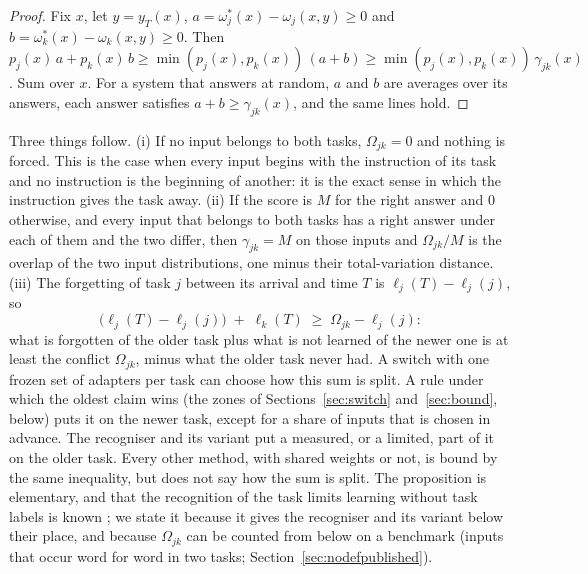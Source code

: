 \begin{proof}
Fix $x$, let $y = y_T(x)$, $a = \omega_j^*(x) - \omega_j(x, y) \ge 0$ and $b = \omega_k^*(x) - \omega_k(x, y) \ge 0$.
Then $p_j(x)\, a + p_k(x)\, b \ge \min(p_j(x), p_k(x))\,(a + b) \ge \min(p_j(x), p_k(x))\, \gamma_{jk}(x)$.
Sum over $x$. For a system that answers at random, $a$ and $b$ are averages over its answers, each
answer satisfies $a + b \ge \gamma_{jk}(x)$, and the same lines hold.
\end{proof}

Three things follow. (i) If no input belongs to both tasks, $\Omega_{jk} = 0$ and nothing is
forced. This is the case when every input begins with the instruction of its task and no
instruction is the beginning of another: it is the exact sense in which the instruction gives the
task away. (ii) If the score is $M$ for the right answer and $0$ otherwise, and every input that
belongs to both tasks has a right answer under each of them and the two differ, then
$\gamma_{jk} = M$ on those inputs and $\Omega_{jk}/M$ is the overlap of the two input
distributions, one minus their total-variation distance. (iii) The forgetting of task $j$ between
its arrival and time $T$ is $\ell_j(T) - \ell_j(j)$, so
\[
  \bigl(\ell_j(T) - \ell_j(j)\bigr) \;+\; \ell_k(T) \;\ge\; \Omega_{jk} - \ell_j(j) :
\]
what is forgotten of the older task plus what is not learned of the newer one is at least the
conflict $\Omega_{jk}$, minus what the older task never had. A switch with one frozen set of
adapters per task can choose how this sum is split. A rule under which the oldest claim wins
(the zones of Sections~\ref{sec:switch} and~\ref{sec:bound}, below) puts it on the newer task,
except for a share of inputs that is chosen in advance. The recogniser and its variant \handicap{}
put a measured, or a limited, part of it on the older task. Every other method, with shared weights or not, is bound by the same inequality, but
does not say how the sum is split. The proposition is elementary, and that the recognition of the
task limits learning without task labels is known \citep{kim2022theoretical}; we state it because
it gives the recogniser and its variant below their place, and because $\Omega_{jk}$ can be counted from below on a
benchmark (inputs that occur word for word in two tasks; Section~\ref{sec:nodefpublished}).

